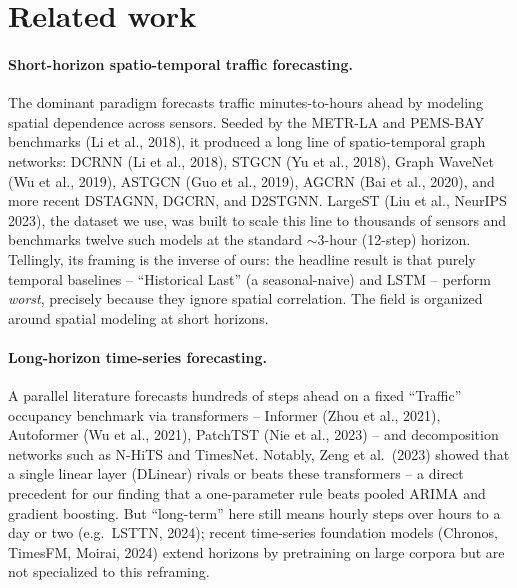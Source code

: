 \documentclass[11pt]{article}
\begin{document}
\section{Related work}
\label{sec:related}
\paragraph{Short-horizon spatio-temporal traffic forecasting.} The dominant
paradigm forecasts traffic minutes-to-hours ahead by modeling spatial dependence
across sensors. Seeded by the METR-LA and PEMS-BAY benchmarks (Li et al., 2018), it
produced a long line of spatio-temporal graph networks: DCRNN (Li et al., 2018),
STGCN (Yu et al., 2018), Graph WaveNet (Wu et al., 2019), ASTGCN (Guo et al., 2019),
AGCRN (Bai et al., 2020), and more recent DSTAGNN, DGCRN, and D2STGNN. LargeST (Liu
et al., NeurIPS 2023), the dataset we use, was built to scale this line to thousands
of sensors and benchmarks twelve such models at the standard $\sim$3-hour (12-step)
horizon. Tellingly, its framing is the inverse of ours: the headline result is that
purely temporal baselines -- ``Historical Last'' (a seasonal-naive) and LSTM --
perform \emph{worst}, precisely because they ignore spatial correlation. The field
is organized around spatial modeling at short horizons.

\paragraph{Long-horizon time-series forecasting.} A parallel literature forecasts
hundreds of steps ahead on a fixed ``Traffic'' occupancy benchmark via transformers
-- Informer (Zhou et al., 2021), Autoformer (Wu et al., 2021), PatchTST (Nie et al.,
2023) -- and decomposition networks such as N-HiTS and TimesNet. Notably, Zeng et
al.\ (2023) showed that a single linear layer (DLinear) rivals or beats these
transformers -- a direct precedent for our finding that a one-parameter rule beats
pooled ARIMA and gradient boosting. But ``long-term'' here still means hourly steps
over hours to a day or two (e.g.\ LSTTN, 2024); recent time-series foundation models
(Chronos, TimesFM, Moirai, 2024) extend horizons by pretraining on large corpora but
are not specialized to this reframing.
\end{document}
